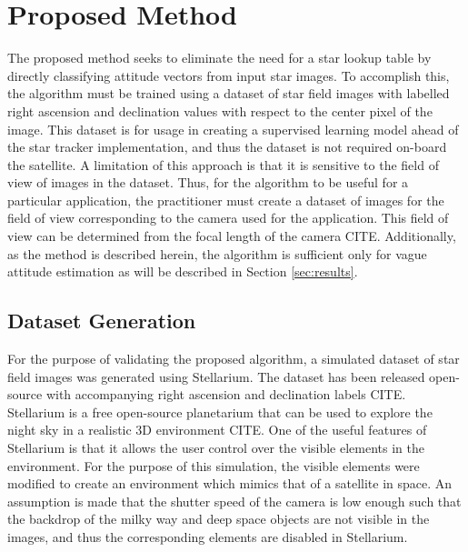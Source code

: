 \documentclass[10pt,twocolumn,letterpaper]{article}
\begin{document}
\section{Proposed Method}
\label{sec:method}

The proposed method seeks to eliminate the need for a star lookup table by directly classifying attitude vectors from input star images. To accomplish this, the algorithm must be trained using a dataset of star field images with labelled right ascension and declination values with respect to the center pixel of the image. This dataset is for usage in creating a supervised learning model ahead of the star tracker implementation, and thus the dataset is not required on-board the satellite. A limitation of this approach is that it is sensitive to the field of view of images in the dataset. Thus, for the algorithm to be useful for a particular application, the practitioner must create a dataset of images for the field of view corresponding to the camera used for the application. This field of view can be determined from the focal length of the camera CITE. Additionally, as the method is described herein, the algorithm is sufficient only for vague attitude estimation as will be described in Section \ref{sec:results}.

\subsection{Dataset Generation}

For the purpose of validating the proposed algorithm, a simulated dataset of star field images was generated using Stellarium. The dataset has been released open-source with accompanying right ascension and declination labels CITE. Stellarium is a free open-source planetarium that can be used to explore the night sky in a realistic 3D environment CITE. One of the useful features of Stellarium is that it allows the user control over the visible elements in the environment. For the purpose of this simulation, the visible elements were modified to create an environment which mimics that of a satellite in space. An assumption is made that the shutter speed of the camera is low enough such that the backdrop of the milky way and deep space objects are not visible in the images, and thus the corresponding elements are disabled in Stellarium.
\end{document}

